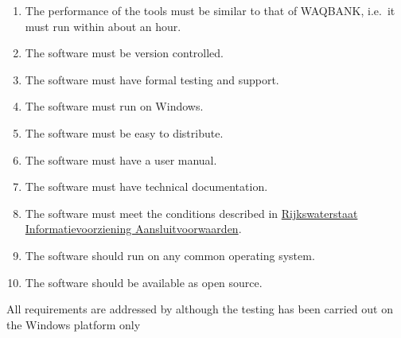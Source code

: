 \begin{enumerate}
\item The performance of the tools must be similar to that of WAQBANK, i.e.~it must run within about an hour.
\item The software must be version controlled.
\item The software must have formal testing and support.
\item The software must run on Windows.
\item The software must be easy to distribute.
\item The software must have a user manual.
\item The software must have technical documentation.
\item The software must meet the conditions described in \href{http://publicaties.minienm.nl/documenten/rijkswaterstaat-informatievoorziening-aansluitvoorwaarden-riva-2017}{Rijkswaterstaat Informatievoorziening Aansluitvoorwaarden}.

\item The software should run on any common operating system.
\item The software should be available as open source.
\end{enumerate}

All requirements are addressed by \dfastbe although the testing has been carried out on the Windows platform only
